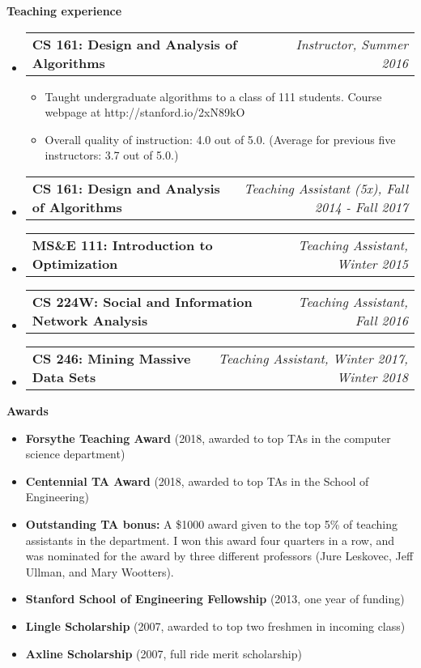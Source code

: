 \documentclass[letterpaper,10pt]{article}
\makeatletter
\newcommand{\resheading}[1]{{\large \colorbox{mygrey}{\begin{minipage}{\textwidth}{\textbf{#1 \vphantom{p\^{E}}}}\end{minipage}}}}
\newcommand{\ressubheading}[4]{
\begin{tabular*}{7.0in}{l@{\extracolsep{\fill}}r}
		\textbf{#1} & \textit{#4} \\
\end{tabular*}\vspace{-6pt}}
\makeatother
\begin{document}
\resheading{Teaching experience}
\begin{itemize}
\item
	\ressubheading{CS 161: Design and Analysis of Algorithms}{Stanford, CA}{Instructor}{Instructor, Summer 2016}
	\begin{itemize}
	\item Taught undergraduate algorithms to a class of 111 students.  Course webpage at http://stanford.io/2xN89kO
	\item Overall quality of instruction: 4.0 out of 5.0.  (Average for previous five instructors: 3.7 out of 5.0.)
	\end{itemize}
\item
	\ressubheading{CS 161: Design and Analysis of Algorithms}{Stanford, CA}{Teaching Assistant}{Teaching Assistant (5x), Fall 2014 - Fall 2017}
\item
	\ressubheading{MS\&E 111: Introduction to Optimization}{Stanford, CA}{Teaching Assistant}{Teaching Assistant, Winter 2015}
\item
	\ressubheading{CS 224W: Social and Information Network Analysis}{Stanford, CA}{Teaching Assistant}{Teaching Assistant, Fall 2016}
\item
	\ressubheading{CS 246: Mining Massive Data Sets}{Stanford, CA}{Teaching Assistant}{Teaching Assistant, Winter 2017, Winter 2018}
\end{itemize}

\resheading{Awards}
\begin{itemize}
    \item \textbf{Forsythe Teaching Award} (2018, awarded to top TAs in the computer science department)
    \item \textbf{Centennial TA Award} (2018, awarded to top TAs in the School of Engineering)
    \item \textbf{Outstanding TA bonus:} A \$1000 award given to the top 5\% of teaching assistants in the department.  I won this award four quarters in a row, and was nominated for the award by three different professors (Jure Leskovec, Jeff Ullman, and Mary Wootters).
	\item \textbf{Stanford School of Engineering Fellowship} (2013, one year of funding)
	\item \textbf{Lingle Scholarship} (2007, awarded to top two freshmen in incoming class)
	\item \textbf{Axline Scholarship} (2007, full ride merit scholarship)
\end{itemize}
\end{document}
